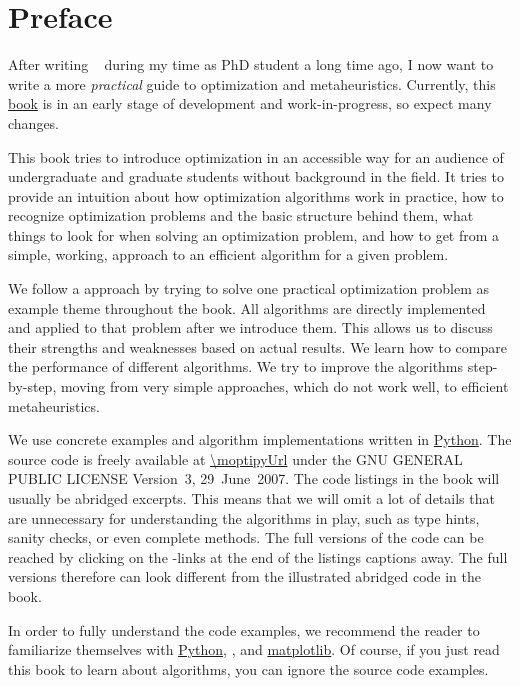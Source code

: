 \chapter*{Preface}%
%
%
After writing ~\cite{W2009GOATAA} during my time as PhD student a long time ago, I now want to write a more \emph{practical} guide to optimization and metaheuristics.
Currently, this \href{\oaUrl/index.html}{book} is in an early stage of development and work-in-progress, so expect many changes.

This book tries to introduce optimization in an accessible way for an audience of undergraduate and graduate students without background in the field.
It tries to provide an intuition about how optimization algorithms work in practice, how to recognize optimization problems and the basic structure behind them, what things to look for when solving an optimization problem, and how to get from a simple, working,  approach to an efficient algorithm for a given problem.

We follow a  approach by trying to solve one practical optimization problem as example theme throughout the book.
All algorithms are directly implemented and applied to that problem after we introduce them.
This allows us to discuss their strengths and weaknesses based on actual results.
We learn how to compare the performance of different algorithms.
We try to improve the algorithms step-by-step, moving from very simple approaches, which do not work well, to efficient metaheuristics.

We use concrete examples and algorithm implementations written in \href{https://python.org}{Python}.
The source code is freely available at \url{\moptipyUrl} under the GNU GENERAL PUBLIC LICENSE Version~3, 29~June~2007.
The code listings in the book will usually be abridged excerpts.
This means that we will omit a lot of details that are unnecessary for understanding the algorithms in play, such as type hints, sanity checks, or even complete methods.
The full versions of the code can be reached by clicking on the -links at the end of the listings captions away.
The full versions therefore can look different from the illustrated abridged code in the book.

In order to fully understand the code examples, we recommend the reader to familiarize themselves with \href{https://python.org}{Python}, \numpy, and \href{https://matplotlib.org/}{matplotlib}.
Of course, if you just read this book to learn about algorithms, you can ignore the source code examples.

